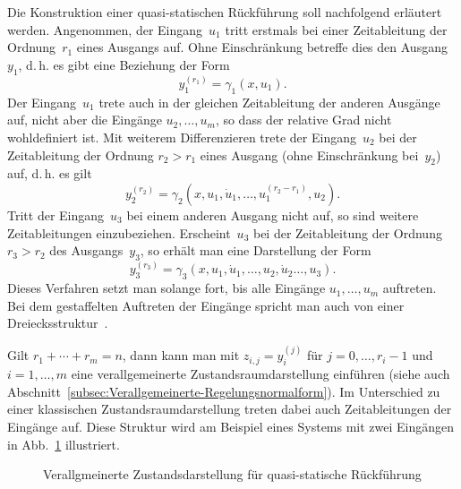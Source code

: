 Die Konstruktion einer quasi-statischen Rückführung soll nachfolgend
erläutert werden. Angenommen, der Eingang~$u_{1}$ tritt erstmals
bei einer Zeit\-ableitung der Ordnung~$r_{1}$ eines Ausgangs auf.
Ohne Einschränkung betreffe dies den Ausgang~$y_{1}$, d.\,h. es
gibt eine Beziehung der Form 
\begin{equation}
y_{1}^{(r_{1})}=\gamma_{1}(x,u_{1}).\label{eq:quasi-y1}
\end{equation}
Der Eingang~$u_{1}$ trete auch in der gleichen Zeit\-ableitung
der anderen Ausgänge auf, nicht aber die Eingänge $u_{2},\ldots,u_{m}$,
so dass der relative Grad nicht wohldefiniert ist. Mit weiterem Differenzieren
trete der Eingang~$u_{2}$ bei der Zeit\-ableitung der Ordnung $r_{2}>r_{1}$
eines Ausgang (ohne Einschränkung bei~$y_{2}$) auf, d.\,h. es gilt
\begin{equation}
y_{2}^{(r_{2})}=\gamma_{2}(x,u_{1},\dot{u}_{1},\ldots,u_{1}^{(r_{2}-r_{1})},u_{2}).\label{eq:quasi-y2}
\end{equation}
Tritt der Eingang~$u_{3}$ bei einem anderen Ausgang nicht auf, so
sind weitere Zeit\-ableitungen einzubeziehen. Erscheint~$u_{3}$
bei der Zeit\-ableitung der Ordnung $r_{3}>r_{2}$ des Ausgangs~$y_{3}$,
so erhält man eine Darstellung der Form 
\begin{equation}
y_{3}^{(r_{3})}=\gamma_{3}(x,u_{1},\dot{u}_{1},\ldots,u_{2},\dot{u}_{2}\ldots,u_{3}).\label{eq:quasi-y3}
\end{equation}
Dieses Verfahren setzt man solange fort, bis alle Eingänge $u_{1},\ldots,u_{m}$
auftreten. Bei dem gestaffelten Auftreten der Eingänge spricht man
auch von einer Dreiecksstruktur~\cite{rudolph2005at}.

Gilt $r_{1}+\cdots+r_{m}=n$, dann kann man mit $z_{i,j}=y_{i}^{(j)}$
für $j=0,\ldots,r_{i}-1$ und $i=1,\ldots,m$ eine verallgemeinerte
Zustandsraumdarstellung einführen (siehe auch Abschnitt~\ref{subsec:Verallgemeinerte-Regelungsnormalform}).
Im Unterschied zu einer klassischen Zustandsraumdarstellung treten
dabei auch Zeitableitungen der Eingänge auf. Diese Struktur wird am
Beispiel eines Systems mit zwei Eingängen in Abb.~\ref{fig:verall-zustand-quasi-statisch}
illustriert.

\begin{figure}
\begin{centering}

\par\end{centering}
\caption{Verallgmeinerte Zustandsdarstellung für quasi-statische Rückführung\label{fig:verall-zustand-quasi-statisch}}

\end{figure}

